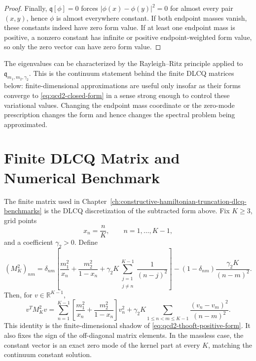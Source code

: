 \begin{proof}
Finally, \(\mathfrak q[\phi]=0\) forces
\(|\phi(x)-\phi(y)|^2=0\) for almost every pair \((x,y)\), hence
\(\phi\) is almost everywhere constant.  If both endpoint masses vanish,
these constants indeed have zero form value.  If at least one endpoint mass
is positive, a nonzero constant has infinite or positive endpoint-weighted
form value, so only the zero vector can have zero form value.
\end{proof}

\begin{remark}
\label{rem:qcd2-min-max-spectral-coordinates}
The eigenvalues can be characterized by the Rayleigh--Ritz principle applied
to \(\mathfrak q_{m_1,m_2,\gamma_2}\).  This is the continuum statement
behind the finite DLCQ matrices below: finite-dimensional approximations are
useful only insofar as their forms converge to \eqref{eq:qcd2-closed-form} in
a sense strong enough to control these variational values.  Changing the
endpoint mass coordinate or the zero-mode prescription changes the form and
hence changes the spectral problem being approximated.
\end{remark}

\section{Finite DLCQ Matrix and Numerical Benchmark}

The finite matrix used in
Chapter~\ref{ch:constructive-hamiltonian-truncation-dlcq-benchmarks} is the
DLCQ discretization of the subtracted form above.  Fix \(K\ge3\), grid points
\[
  x_n=\frac nK,\qquad n=1,\ldots,K-1,
\]
and a coefficient \(\gamma_2>0\).  Define
\begin{equation}
  (M_K^2)_{nm}
  =
  \delta_{nm}
  \left[
    \frac{m_1^2}{x_n}
    +
    \frac{m_2^2}{1-x_n}
    +
    \gamma_2K
    \sum_{\substack{j=1\\j\ne n}}^{K-1}\frac1{(n-j)^2}
  \right]
  -
  (1-\delta_{nm})\frac{\gamma_2K}{(n-m)^2}.
  \label{eq:qcd2-thooft-dlcq-matrix}
\end{equation}
Then, for \(v\in\mathbb R^{K-1}\),
\begin{equation}
  v^TM_K^2v
  =
  \sum_{n=1}^{K-1}
  \left[
    \frac{m_1^2}{x_n}
    +
    \frac{m_2^2}{1-x_n}
  \right]v_n^2
  +
  \gamma_2K
  \sum_{1\le n<m\le K-1}
  \frac{(v_n-v_m)^2}{(n-m)^2}.
  \label{eq:qcd2-thooft-dlcq-quadratic-form}
\end{equation}
This identity is the finite-dimensional shadow of
\eqref{eq:qcd2-thooft-positive-form}.  It also fixes the sign of the
off-diagonal matrix elements.  In the massless case, the constant vector is
an exact zero mode of the kernel part at every \(K\), matching the continuum
constant solution.

